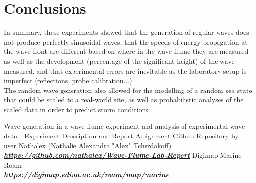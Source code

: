 \documentclass{article}
\begin{document}
	\section{Conclusions}
	In summary, these experiments showed that the generation of regular waves does not produce perfectly sinusoidal waves, that the speeds of energy propagation at the wave front are different based on where in the wave flume they are measured as well as the development (percentage of the significant height) of the wave measured, and that experimental errors are inevitable as the laboratory setup is imperfect (reflections, probe calibration...)\\
	The random wave generation also allowed for the modelling of a random sea state that could be scaled to a real-world site, as well as probabilistic analyses of the scaled data in order to predict storm conditions.
	\begin{thebibliography}{1}
		 Wave generation in a wave-flume experiment and analysis of experimental wave data - Experiment Description and Report Assignment
		 Github Repository by user Nathalex (Nathalie Alexandra "Alex" Tcherdakoff)\\ \href{https://github.com/nathalex/Wave-Flume-Lab-Report}{\textbf{\textit{https://github.com/nathalex/Wave-Flume-Lab-Report}}}
		 Digimap Marine Roam\\
		\href{https://digimap.edina.ac.uk/roam/map/marine}{\textit{\textbf{https://digimap.edina.ac.uk/roam/map/marine}}}
	\end{thebibliography}
\end{document}
